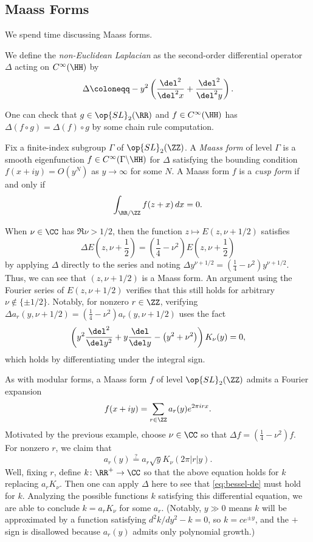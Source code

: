 \documentclass{article}
\begin{document}
\subsection{Maass Forms}
We spend time discussing Maass forms.
\begin{definition}[Laplacian]
	We define the \textit{non-Euclidean Laplacian} as the second-order differential operator $\Delta$ acting on $C^\infty(\HH)$ by
	\[\Delta\coloneqq-y^2\left(\frac{\del^2}{\del^2x}+\frac{\del^2}{\del^2y}\right).\]
\end{definition}
One can check that $g\in\op{SL}_2(\RR)$ and $f\in C^\infty(\HH)$ has $\Delta(f\circ g)=\Delta(f)\circ g$ by some chain rule computation.
\begin{definition}
	Fix a finite-index subgroup $\Gamma$ of $\op{SL}_2(\ZZ)$. A \textit{Maass form} of level $\Gamma$ is a smooth eigenfunction $f\in C^\infty(\Gamma\backslash\HH)$ for $\Delta$ satisfying the bounding condition $f(x+iy)=O\left(y^N\right)$ as $y\to\infty$ for some $N$. A Maass form $f$ is a \textit{cusp form} if and only if
	\[\int_{\RR/\ZZ}f(z+x)\,dx=0.\]
\end{definition}
\begin{example}
	When $\nu\in\CC$ has $\Re \nu>1/2$, then the function $z\mapsto E(z,\nu+1/2)$ satisfies
	\[\Delta E\left(z,\nu+\frac12\right)=\left(\frac14-\nu^2\right)E\left(z,\nu+\frac12\right)\]
	by applying $\Delta$ directly to the series and noting $\Delta y^{\nu+1/2}=\left(\frac14-\nu^2\right)y^{\nu+1/2}$. Thus, we can see that $(z,\nu+1/2)$ is a Maass form. An argument using the Fourier series of $E(z,\nu+1/2)$ verifies that this still holds for arbitrary $\nu\notin\{\pm1/2\}$. Notably, for nonzero $r\in\ZZ$, verifying $\Delta a_r(y,\nu+1/2)=\left(\frac14-\nu^2\right)a_r(y,\nu+1/2)$ uses the fact
	\begin{equation}
		\left(y^2\frac{\del^2}{\del y^2}+y\frac{\del}{\del y}-\left(y^2+\nu^2\right)\right)K_\nu(y)=0, \label{eq:bessel-de}
	\end{equation}
	which holds by differentiating under the integral sign.
\end{example}
\begin{remark}
	As with modular forms, a Maass form $f$ of level $\op{SL}_2(\ZZ)$ admits a Fourier expansion
	\[f(x+iy)=\sum_{r\in\ZZ}a_r(y)e^{2\pi irx}.\]
	Motivated by the previous example, choose $\nu\in\CC$ so that $\Delta f=\left(\frac14-\nu^2\right)f$. For nonzero $r$, we claim that
	\[a_r(y)\stackrel?=a_r\sqrt yK_\nu(2\pi\left|r\right|y).\]
	Well, fixing $r$, define $k\colon\RR^+\to\CC$ so that the above equation holds for $k$ replacing $a_rK_\nu$. Then one can apply $\Delta$ here to see that \eqref{eq:bessel-de} must hold for $k$. Analyzing the possible functions $k$ satisfying this differential equation, we are able to conclude $k=a_rK_\nu$ for some $a_r$. (Notably, $y\gg0$ means $k$ will be approximated by a function satisfying $d^2k/dy^2-k=0$, so $k=ce^{\pm y}$, and the $+$ sign is disallowed because $a_r(y)$ admits only polynomial growth.)
\end{remark}
\end{document}
